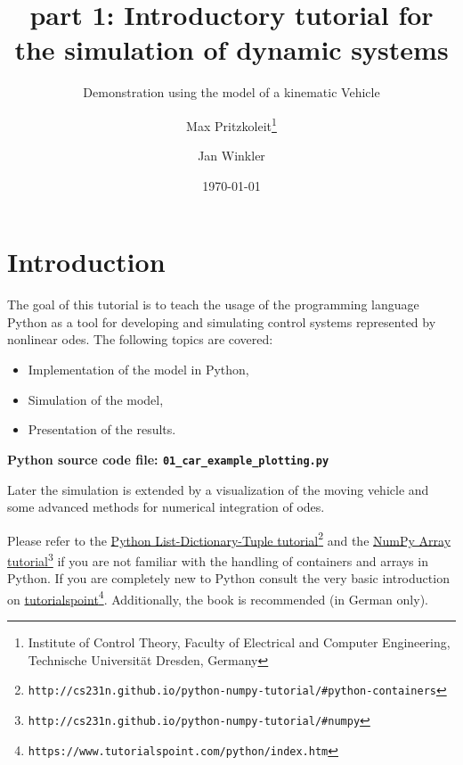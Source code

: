 \documentclass[a4paper,11pt,headinclude=true,headsepline,parskip=half,DIV=12]{scrartcl}
\title{part 1: Introductory tutorial for the simulation of dynamic systems}
\subtitle{Demonstration using the model of a kinematic Vehicle}
\author{Max Pritzkoleit\thanks{Institute of Control Theory, Faculty of Electrical and Computer Engineering, Technische Universität Dresden, Germany} \and Jan Winkler\footnotemark[1]}
\date{\today}
\newcommand{\py}{Python\xspace}
\begin{document}
\maketitle




\tableofcontents

\newpage

\section{Introduction}
The goal of this tutorial is to teach the usage of the programming language \py as a tool for developing and simulating control systems  represented by nonlinear \glspl{ode}. The following topics are covered:
\begin{itemize}
\item Implementation of the model in \py,
\item Simulation of the model,
\item Presentation of the results.
\end{itemize}
\textbf{\py source code file: \texttt{01\_car\_example\_plotting.py}}

Later the simulation is extended by a visualization of the moving vehicle and some advanced methods for numerical integration of \glspl{ode}.

Please refer to the \href{http://cs231n.github.io/python-numpy-tutorial/#python-containers}{Python List-Dictionary-Tuple tutorial}\footnote{\texttt{http://cs231n.github.io/python-numpy-tutorial/\#python-containers}} and the \href{http://cs231n.github.io/python-numpy-tutorial/#numpy}{NumPy Array tutorial}\footnote{\texttt{http://cs231n.github.io/python-numpy-tutorial/\#numpy}} if you are not familiar with the handling of containers and arrays in Python. If you are completely new to \py consult the very basic introduction on \href{https://www.tutorialspoint.com/python/index.htm}{tutorialspoint}\footnote{\texttt{https://www.tutorialspoint.com/python/index.htm}}. Additionally, the book \cite{KnollPython21} is recommended (in German only).
\end{document}
